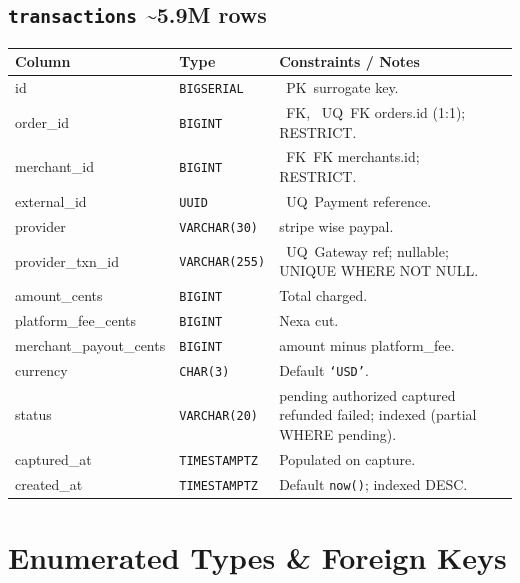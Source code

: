 \documentclass[8pt,a4paper]{extarticle}
\newcommand{\pkbadge}{\textcolor{primary}{\faKey}~PK}
\newcommand{\fkbadge}{\textcolor{secondary}{\faKey}~FK}
\newcommand{\uqbadge}{\textcolor{accent}{\faPen}~UQ}
\newcommand{\tttype}[1]{\texttt{#1}}
\newcommand{\tableheader}[2]{\subsection{\texttt{#1} \textcolor{accent}{\textbar{} #2}}}
\begin{document}
\tableheader{transactions}{\textasciitilde{}5.9M rows}
\begin{tcolorbox}[schemaframe]
  \renewcommand{\arraystretch}{1.05}
  \begin{tabularx}{\linewidth}{p{2cm} p{1.6cm} X p{2cm}}
    \toprule
    \rowcolor{primary!10}\textbf{Column} & \textbf{Type} & \textbf{Constraints / Notes} \\
    \midrule
    id                   & \tttype{BIGSERIAL}   & \pkbadge\ surrogate key. \\
    order\_id            & \tttype{BIGINT}      & \fkbadge, \uqbadge\ FK \textrightarrow{} orders.id (1:1); RESTRICT. \\
    merchant\_id         & \tttype{BIGINT}      & \fkbadge\ FK \textrightarrow{} merchants.id; RESTRICT. \\
    external\_id         & \tttype{UUID}        & \uqbadge\ Payment reference. \\
    provider             & \tttype{VARCHAR(30)} & stripe \textbar{} wise \textbar{} paypal. \\
    provider\_txn\_id    & \tttype{VARCHAR(255)}& \uqbadge\ Gateway ref; nullable; UNIQUE WHERE NOT NULL. \\
    amount\_cents        & \tttype{BIGINT}      & Total charged. \\
    platform\_fee\_cents & \tttype{BIGINT}      & Nexa cut. \\
    merchant\_payout\_cents&\tttype{BIGINT}    & amount minus platform\_fee. \\
    currency             & \tttype{CHAR(3)}     & Default \texttt{`USD'}. \\
    status               & \tttype{VARCHAR(20)} & pending \textbar{} authorized \textbar{} captured \textbar{} refunded \textbar{} failed; indexed (partial WHERE pending). \\
    captured\_at         & \tttype{TIMESTAMPTZ} & Populated on capture. \\
    created\_at          & \tttype{TIMESTAMPTZ} & Default \texttt{now()}; indexed DESC. \\
    \bottomrule
  \end{tabularx}
\end{tcolorbox}

\section{Enumerated Types \& Foreign Keys}
\end{document}
